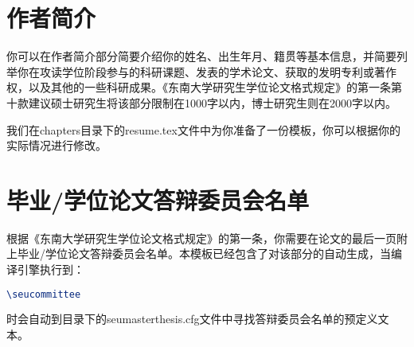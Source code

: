 \begin{tcolorbox}
\begin{lstlisting}[language=TeX]

\end{lstlisting}
\end{tcolorbox}

\section{作者简介}

你可以在作者简介部分简要介绍你的姓名、出生年月、籍贯等基本信息，并简要列举你在攻读学位阶段参与的科研课题、发表的学术论文、获取的发明专利或著作权，以及其他的一些科研成果。《东南大学研究生学位论文格式规定》\cite{seugs2023rule}的第一条第十款建议硕士研究生将该部分限制在1000字以内，博士研究生则在2000字以内。

我们在chapters目录下的resume.tex文件中为你准备了一份模板，你可以根据你的实际情况进行修改。

\section{毕业/学位论文答辩委员会名单}

根据《东南大学研究生学位论文格式规定》\cite{seugs2023rule}的第一条，你需要在论文的最后一页附上毕业/学位论文答辩委员会名单。本模板已经包含了对该部分的自动生成，当编译引擎执行到：

\begin{tcolorbox}
\begin{lstlisting}[language=TeX]
\seucommittee
\end{lstlisting}
\end{tcolorbox}

\noindent 时会自动到目录下的seumasterthesis.cfg文件中寻找答辩委员会名单的预定义文本。

